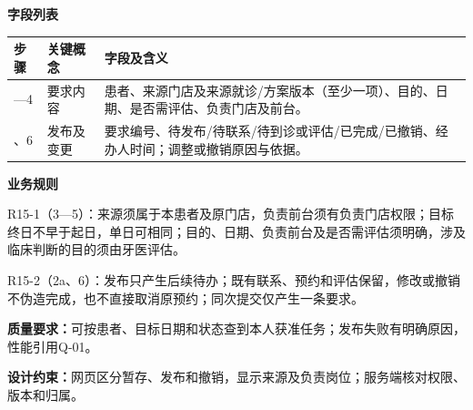 \documentclass[UTF8,a4paper,zihao=-4,fontset=none]{ctexart}
\begin{document}
\noindent\textbf{字段列表}\par
{\setlength{\tabcolsep}{3pt}\renewcommand{\arraystretch}{1.04}
\noindent\begin{tabular}{@{}>{\raggedright\arraybackslash}p{1.2cm}>{\raggedright\arraybackslash}p{2.2cm}>{\raggedright\arraybackslash}p{12.3cm}@{}}
\toprule
步骤 & 关键概念 & 字段及含义 \\ \midrule
1—4 & 要求内容 & 患者、来源门店及来源就诊/方案版本（至少一项）、目的、日期、是否需评估、负责门店及前台。 \\
5、6 & 发布及变更 & 要求编号、待发布/待联系/待到诊或评估/已完成/已撤销、经办人时间；调整或撤销原因与依据。 \\
\bottomrule
\end{tabular}\par}
\smallskip
\noindent\textbf{业务规则}\par
\noindent R15-1（3—5）：来源须属于本患者及原门店，负责前台须有负责门店权限；目标终日不早于起日，单日可相同；目的、日期、负责前台及是否需评估须明确，涉及临床判断的目的须由牙医评估。\par
\noindent R15-2（2a、6）：发布只产生后续待办；既有联系、预约和评估保留，修改或撤销不伪造完成，也不直接取消原预约；同次提交仅产生一条要求。\par
\smallskip
\noindent\textbf{质量要求：}可按患者、目标日期和状态查到本人获准任务；发布失败有明确原因，性能引用Q-01。\par
\noindent\textbf{设计约束：}网页区分暂存、发布和撤销，显示来源及负责岗位；服务端核对权限、版本和归属。\par
\endgroup
\clearpage
\end{document}
